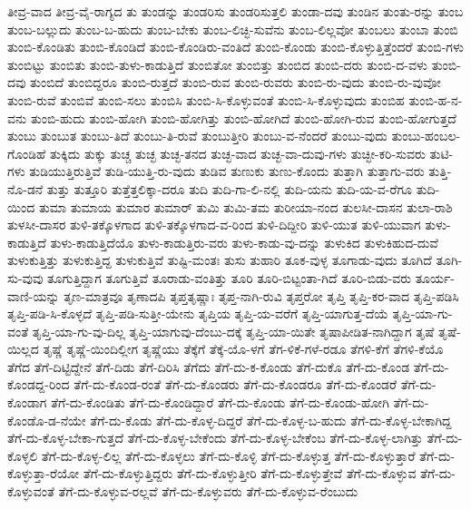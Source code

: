 ತೀವ್ರ-ವಾದ
ತೀವ್ರ-ವೈ-ರಾಗ್ಯದ
ತು
ತುಂಡನ್ನು
ತುಂಡರಿಸು
ತುಂಡರಿಸುತ್ತಲಿ
ತುಂಡಾ-ದವು
ತುಂಡಿನ
ತುಂತು-ರನ್ನು
ತುಂಬ
ತುಂಬ-ಬಲ್ಲುದು
ತುಂಬ-ಬ-ಹುದು
ತುಂಬ-ಬೇಕು
ತುಂಬ-ಲಿಚ್ಛಿ-ಸುವೆನು
ತುಂಬ-ಲಿಲ್ಲವೋ
ತುಂಬಲು
ತುಂಬಾ
ತುಂಬಿ
ತುಂಬಿ-ಕೊಂಡಿತು
ತುಂಬಿ-ಕೊಂಡಿದೆ
ತುಂಬಿ-ಕೊಂಡಿರು-ವಂತಿದೆ
ತುಂಬಿ-ಕೊಂಡು
ತುಂಬಿ-ಕೊಳ್ಳುತ್ತಿತ್ತೆಂದರೆ
ತುಂಬಿ-ಗಳು
ತುಂಬಿಟ್ಟು
ತುಂಬಿತು
ತುಂಬಿ-ತುಳು-ಕಾಡುತ್ತಿದೆ
ತುಂಬಿತೋ
ತುಂಬಿತ್ತು
ತುಂಬಿದ
ತುಂಬಿ-ದರು
ತುಂಬಿ-ದ-ವಳು
ತುಂಬಿ-ದವು
ತುಂಬಿದೆ
ತುಂಬಿದ್ದರೂ
ತುಂಬಿ-ರುತ್ತದೆ
ತುಂಬಿ-ರುವ
ತುಂಬಿ-ರುವರು
ತುಂಬಿ-ರು-ವುದು
ತುಂಬಿ-ರು-ವುವೋ
ತುಂಬಿ-ರುವೆ
ತುಂಬಿವೆ
ತುಂಬಿ-ಸಲು
ತುಂಬಿಸಿ
ತುಂಬಿ-ಸಿ-ಕೊಳ್ಳುವಂತೆ
ತುಂಬಿ-ಸಿ-ಕೊಳ್ಳುವುದು
ತುಂಬಿಹ
ತುಂಬಿ-ಹ-ನ-ವನು
ತುಂಬಿ-ಹುದು
ತುಂಬಿ-ಹೋಗಿ
ತುಂಬಿ-ಹೋಗಿತ್ತು
ತುಂಬಿ-ಹೋಗಿದೆ
ತುಂಬಿ-ಹೋಗಿ-ರುವ
ತುಂಬಿ-ಹೋಗುತ್ತದೆ
ತುಂಬು
ತುಂಬುತ
ತುಂಬು-ತಿದೆ
ತುಂಬು-ತಿ-ರುವೆ
ತುಂಬುತ್ತೀರಿ
ತುಂಬು-ವ-ನೆಂದರೆ
ತುಂಬು-ವುದು
ತುಂಬು-ಹಂಬಲ-ಗೊಂಡಿಹೆ
ತುಕ್ಕಿದು
ತುಕ್ಕು
ತುಚ್ಚ
ತುಚ್ಛ
ತುಚ್ಛ-ತನದ
ತುಚ್ಛ-ವಾದ
ತುಚ್ಛ-ವಾ-ದುವು-ಗಳು
ತುಚ್ಛೀ-ಕರಿ-ಸುವರು
ತುಟಿ-ಗಳು
ತುಡಿಯುತ್ತಿರುತ್ತಿವೆ
ತುಡಿ-ಯುತ್ತಿ-ರು-ವುದು
ತುಡಿವ
ತುಣುಕು
ತುಣು-ಕೊಂದು
ತುತ್ತಾಗಿ
ತುತ್ತಾಗು-ವರು
ತುತ್ತಿ-ನೊ-ಡನೆ
ತುತ್ತು
ತುತ್ತೂರಿ
ತುತ್ತೆತ್ತಲಿಕ್ಕಾ-ದರೂ
ತುದಿ
ತುದಿ-ಗಾ-ಲಿ-ನಲ್ಲಿ
ತುದಿ-ಯನು
ತುದಿ-ಯ-ವ-ರೆಗೂ
ತುದಿ-ಯಿಂದ
ತುಮಾ
ತುಮಾಯ
ತುಮಾರ
ತುಮಾರ್‌
ತುಮಿ
ತುಮಿ-ತಮ
ತುರೀಯಾ-ನಂದ
ತುಲಸೀ-ದಾಸನ
ತುಲಾ-ರಾಶಿ
ತುಳಸೀ-ದಾಸರ
ತುಳಿ-ತಕ್ಕೊಳಗಾದ
ತುಳಿ-ತಕ್ಕೊಳಗಾದ-ವ-ರಿಂದ
ತುಳಿ-ದಿದ್ದೀರಿ
ತುಳಿ-ಯುತ
ತುಳಿ-ಯುವಾಗ
ತುಳು-ಕಾಡುತ್ತಿದೆ
ತುಳು-ಕಾಡುತ್ತಿದೆಯೊ
ತುಳು-ಕಾಡುತ್ತಿರು-ವರು
ತುಳು-ಕಾಡು-ವು-ದನ್ನು
ತುಳುಕಿದ
ತುಳುಕಿಹುದ-ದುವೆ
ತುಳುಕುತ್ತಿತ್ತು
ತುಳುಕುತ್ತಿದ್ದ
ತುಳುಕುತ್ತಿವೆ
ತುಷ್ಟಿ-ಮಂತಃ
ತುಸು
ತುಹಾರಿ
ತೂಕ-ವುಳ್ಳ
ತೂಗಾಡು-ವುದು
ತೂಗಿದೆ
ತೂಗಿ-ಸು-ವುವು
ತೂಗುತ್ತಿದ್ದಾಗ
ತೂಗುತ್ತಿವೆ
ತೂರಾಡು-ವಂತಿತ್ತು
ತೂರಿ
ತೂರಿ-ಬಿಟ್ಟಂತಾ-ಗಿದೆ
ತೂರಿ-ಬಿಡು-ವರು
ತೂರ್ಯ-ವಾಣಿ-ಯನ್ನು
ತೃಣ-ಮಾತ್ರವೂ
ತೃಣಾದಪಿ
ತೃಪ್ತತೃಷ್ಣಾಃ
ತೃಪ್ತ-ನಾಗಿ-ರುವಿ
ತೃಪ್ತರೋ
ತೃಪ್ತಿ
ತೃಪ್ತಿ-ಕರ-ವಾದ
ತೃಪ್ತಿ-ಪಡಿಸಿ
ತೃಪ್ತಿ-ಪಡಿ-ಸಿ-ಕೊಳ್ಳದೆ
ತೃಪ್ತಿ-ಪಡಿ-ಸುತ್ತೀ-ಯೇನು
ತೃಪ್ತಿಯ
ತೃಪ್ತಿ-ಯ-ವರೆಗೆ
ತೃಪ್ತಿ-ಯಾಗುತ್ತ-ದೆಯೆ
ತೃಪ್ತಿ-ಯಾ-ಗು-ವಂತೆ
ತೃಪ್ತಿ-ಯಾ-ಗು-ವು-ದಿಲ್ಲ
ತೃಪ್ತಿ-ಯಾಗುವು-ದೆಂಬು-ದಕ್ಕೆ
ತೃಪ್ತಿ-ಯಾ-ಯಿತೇ
ತೃಷಾಪೀಡಿತ-ನಾಗಿದ್ದಾಗ
ತೃಷೆ
ತೃಷೆ-ಯಿಲ್ಲದ
ತೃಷ್ಣೆ
ತೃಷ್ಣೆ-ಯಿಂದಿಲ್ಲೀಗ
ತೃಷ್ಣೆಯು
ತೆಕ್ಕೆಗೆ
ತೆಕ್ಕೆ-ಯೊ-ಳಗೆ
ತೆಗ-ಳಿಕೆ-ಗಳೆ-ರಡೂ
ತೆಗಳಿ-ಕೆಗೆ
ತೆಗಳಿ-ಕೆಯೊ
ತೆಗೆದ
ತೆಗೆ-ದಿಟ್ಟಿದ್ದೇನೆ
ತೆಗೆ-ದಿಡು
ತೆಗೆ-ದಿರಿಸಿ
ತೆಗೆದು
ತೆಗೆ-ದು-ಕ-ಕೊಂಡು
ತೆಗೆ-ದುಕೊ
ತೆಗೆ-ದು-ಕೊಂಡ
ತೆಗೆ-ದು-ಕೊಂಡದ್ದ-ರಿಂದ
ತೆಗೆ-ದು-ಕೊಂಡ-ರಂತೆ
ತೆಗೆ-ದು-ಕೊಂಡರು
ತೆಗೆ-ದು-ಕೊಂಡರೂ
ತೆಗೆ-ದು-ಕೊಂಡರೆ
ತೆಗೆ-ದು-ಕೊಂಡಾಗ
ತೆಗೆ-ದು-ಕೊಂಡಿತು
ತೆಗೆ-ದು-ಕೊಂಡಿದ್ದಾರೆ
ತೆಗೆ-ದು-ಕೊಂಡು
ತೆಗೆ-ದು-ಕೊಂಡು-ಹೋಗಿ
ತೆಗೆ-ದು-ಕೊಂಡೊ-ಡ-ನೆಯೇ
ತೆಗೆ-ದು-ಕೊಡು
ತೆಗೆ-ದು-ಕೊಳ್ಳ-ದಿದ್ದರೆ
ತೆಗೆ-ದು-ಕೊಳ್ಳ-ಬ-ಹುದು
ತೆಗೆ-ದು-ಕೊಳ್ಳ-ಬೇಕಾಗಿದ್ದ
ತೆಗೆ-ದು-ಕೊಳ್ಳ-ಬೇಕಾ-ಗುತ್ತದೆ
ತೆಗೆ-ದು-ಕೊಳ್ಳ-ಬೇಕೆಂದು
ತೆಗೆ-ದು-ಕೊಳ್ಳ-ಬೇಕೆಂಬ
ತೆಗೆ-ದು-ಕೊಳ್ಳ-ಲಾಗಿತ್ತು
ತೆಗೆ-ದು-ಕೊಳ್ಳಲಿ
ತೆಗೆ-ದು-ಕೊಳ್ಳ-ಲಿಲ್ಲ
ತೆಗೆ-ದು-ಕೊಳ್ಳಲು
ತೆಗೆ-ದು-ಕೊಳ್ಳಿ
ತೆಗೆ-ದು-ಕೊಳ್ಳುತ್ತ
ತೆಗೆ-ದು-ಕೊಳ್ಳುತ್ತಾರೆ
ತೆಗೆ-ದು-ಕೊಳ್ಳುತ್ತಾ-ರೆಯೋ
ತೆಗೆ-ದು-ಕೊಳ್ಳುತ್ತಿದ್ದರು
ತೆಗೆ-ದು-ಕೊಳ್ಳುತ್ತೀರಿ
ತೆಗೆ-ದು-ಕೊಳ್ಳುತ್ತೇವೆ
ತೆಗೆ-ದು-ಕೊಳ್ಳುವ
ತೆಗೆ-ದು-ಕೊಳ್ಳುವಂತೆ
ತೆಗೆ-ದು-ಕೊಳ್ಳುವ-ರಲ್ಲವೆ
ತೆಗೆ-ದು-ಕೊಳ್ಳುವರು
ತೆಗೆ-ದು-ಕೊಳ್ಳುವ-ರೆಂಬುದು
